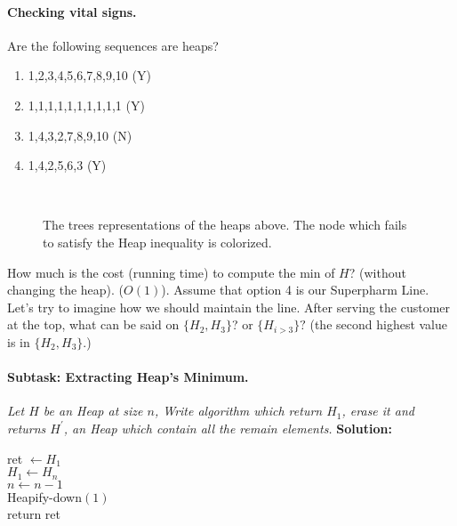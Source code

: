 \paragraph{Checking vital signs.}Are the following sequences are heaps? 
\begin{enumerate}
  \item 1,2,3,4,5,6,7,8,9,10 (Y)
  \item 1,1,1,1,1,1,1,1,1,1  (Y)
  \item 1,4,3,2,7,8,9,10     (N)
  \item 1,4,2,5,6,3	     (Y)
\end{enumerate}
\begin{figure}[h]
  \centering
  \begin{subfigure}[b]{0.45\textwidth}
	
  \end{subfigure}
\begin{subfigure}[b]{0.45\textwidth}
	
  \end{subfigure} 
  \\ 
\begin{subfigure}[b]{0.45\textwidth}
	
  \end{subfigure}
  \caption{The trees representations of the heaps above. The node which fails to satisfy the Heap inequality is colorized.}
\end{figure}
How much is the cost (running time) to compute the min of $H$? (without changing the heap). ($O\left( 1 \right)$). Assume that option 4 is our Superpharm Line. Let's try to imagine how we should maintain the line. After serving the customer at the top, what can be said on $ \{ H_{2}, H_{3}\}$? or $\{H_{i>3}\}?$ (the second highest value is in $\{H_{2}, H_{3} \}$.)   
\paragraph{Subtask: Extracting Heap's Minimum.} \textit{Let $H$ be an Heap at size $n$, Write algorithm which return $H_1$, erase it and returns $H^\prime$, an Heap which contain all the remain elements.} 
\textbf{Solution:} 

\begin{algorithm}[H]
ret $\leftarrow H_{1} $ \\
$ H_{1} \leftarrow H_{n} $  \\
$ n \leftarrow n -1 $ \\
Heapify-down$\left( 1 \right)$ \\
return ret  
\end{algorithm}


